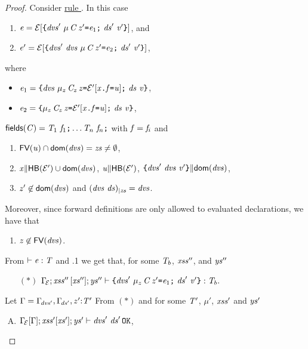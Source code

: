 {\begin{proof}
\medskip\noindent
Consider \underline{rule }.
In this case  
\begin{enumerate}[(1)]
\item $\e=\Ctx{\Block {\dvs'\ \Dec{\Type{\mu}{\C}}{\z'} {\e_1}\ \decs' }{\val'}}$, and 
\item $\e'=\Ctx{\Block{\dvs'\ \dvs\ \Dec{\Type{\mu}{\C}}{\z'} {\e_2}\  \decs'}{\val'}}$, 
\end{enumerate}
where
\begin{itemize}
\item $\e_1={\Block{\dvs\ \Dec{\Type{\mu_z}{\C_z}}{\z}{\CtxP{\FieldAssign{\x}{\f}{\valPrime}}}\ \decs}{\val}}$, 
\item $\e_2={\Block{\Dec{\Type{\mu_z}{\C_z}}{\z}{\CtxP{\FieldAssign{\x}{\f}{\valPrime}}}\ \decs}{\val}}$,
\end{itemize}
$\fields{\C}=\Field{\T_1}{\f_1}\ldots\Field{\T_n}{\f_n}$ with $\f=\f_i$ and
\begin{enumerate}[(1)]\addtocounter{enumi}{2}
\item $\FV{\valPrime}\cap\dom{\dvs}=\zs\neq\emptyset$,
\item $\noCapture{\x}{\HB{\ctxP}\cup\dom{\dvs}}$, $\noCapture{\valPrime}{\HB{\ctxP}}$,
$\noCapture{\Block{\dvs'\ \dvs}{\val'}}{\dom{\dvs}}$,   
\item $\z'\not\in\dom{\dvs}$ and $\Reduct{(\dvs\ \decs)}{{\zs}}=\dvs$.
\end{enumerate}
Moreover, since forward definitions are only allowed to evaluated declarations, we have that 
\begin{enumerate}[(1)]\addtocounter{enumi}{5}
\item $\z\not\in\FV{\dvs}$.
\end{enumerate}
From $\TypeCheckGround{\e}{\T}$ and .1 we get that, for some $\T_b$, $\LentLocked''$, and $\StronglyLocked''$
\begin{itemize}
  \item [$(\ast)$]$
\AuxTypeCheck{{\TypeEnv{\ctx}}}{\LentLocked''}{\MutGroup''}{\StronglyLocked''}{\Block {\dvs'\ \Dec{\Type{\mu_z}{\C}}{\z'} {\e_1}\ \decs' }{\val'}}{\T_b}.
$
\end{itemize}
Let $\Gamma=\TypeEnv{\dvs'},\TypeEnv{\decs'},\TypeDec{\T'}{z'}$ 
From $(\ast)$ and   for some $\T'$, $\mu'$, $\LentLocked'$ and $\StronglyLocked'$
\begin{enumerate} [(A)]
\item $\AuxDecsOK{{\SubstFun{\TypeEnv{\ctx}}{\Gamma}}}{\LentLocked'}{\MutGroup'}{\StronglyLocked'}{\dvs'\ \decs'}$,

\end{enumerate}
\end{proof}}
